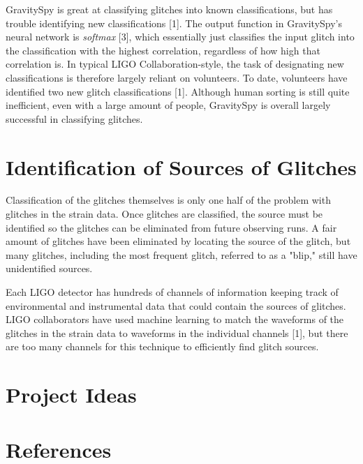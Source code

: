 \documentclass[a4paper]{article}
\begin{document}
GravitySpy is great at classifying glitches into known classifications, but has trouble identifying new classifications [1]. The output function in GravitySpy's neural network is \textit{softmax} [3], which essentially just classifies the input glitch into the classification with the highest correlation, regardless of how high that correlation is. In typical LIGO Collaboration-style, the task of designating new classifications is therefore largely reliant on volunteers. To date, volunteers have identified two new glitch classifications [1]. Although human sorting is still quite inefficient, even with a large amount of people, GravitySpy is overall largely successful in classifying glitches.

\section{Identification of Sources of Glitches}

Classification of the glitches themselves is only one half of the problem with glitches in the strain data. Once glitches are classified, the source must be identified so the glitches can be eliminated from future observing runs. A fair amount of glitches have been eliminated by locating the source of the glitch, but many glitches, including the most frequent glitch, referred to as a "blip," still have unidentified sources.

Each LIGO detector has hundreds of channels of information keeping track of environmental and instrumental data that could contain the sources of glitches. LIGO collaborators have used machine learning to match the waveforms of the glitches in the strain data to waveforms in the individual channels [1], but there are too many channels for this technique to efficiently find glitch sources.

\section{Project Ideas}



\section{References}
\end{document}
